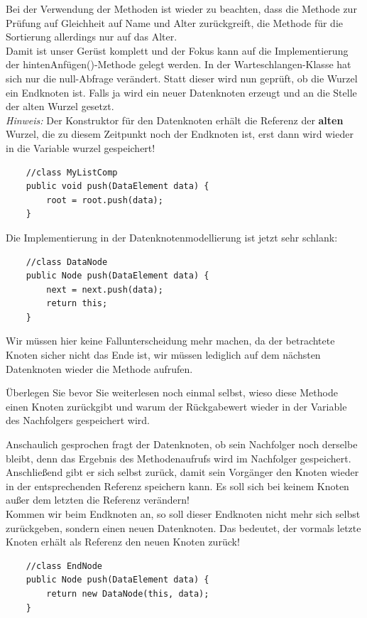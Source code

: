 \documentclass{article}
\begin{document}
Bei der Verwendung der Methoden ist wieder zu beachten, dass die Methode zur Prüfung auf Gleichheit auf Name und Alter zurückgreift, die Methode für die Sortierung allerdings nur auf das Alter. \\
Damit ist unser Gerüst komplett und der Fokus kann auf die Implementierung der hintenAnfügen()-Methode gelegt werden. In der Warteschlangen-Klasse hat sich nur die null-Abfrage verändert. Statt dieser wird nun geprüft, ob die Wurzel ein Endknoten ist. Falls ja wird ein neuer Datenknoten erzeugt und an die Stelle der alten Wurzel gesetzt. \\
\textit{Hinweis:} Der Konstruktor für den Datenknoten erhält die Referenz der \textbf{alten} Wurzel, die zu diesem Zeitpunkt noch der Endknoten ist, erst dann wird wieder in die Variable wurzel gespeichert! 
\begin{verbatim}
    //class MyListComp
    public void push(DataElement data) {
        root = root.push(data);
    }
\end{verbatim}
Die Implementierung in der Datenknotenmodellierung ist jetzt sehr schlank: 
\begin{verbatim}
    //class DataNode
    public Node push(DataElement data) {
        next = next.push(data);
        return this; 
    }
\end{verbatim}
Wir müssen hier keine Fallunterscheidung mehr machen, da der betrachtete Knoten sicher nicht das Ende ist, wir müssen lediglich auf dem nächsten Datenknoten wieder die Methode aufrufen. \\
\begin{task}{1}
Überlegen Sie bevor Sie weiterlesen noch einmal selbst, wieso diese Methode einen Knoten zurückgibt und warum der Rückgabewert wieder in der Variable des Nachfolgers gespeichert wird. 
\end{task}
\vspace{2cm}
Anschaulich gesprochen fragt der Datenknoten, ob sein Nachfolger noch derselbe bleibt, denn das Ergebnis des Methodenaufrufs wird im Nachfolger gespeichert. Anschließend gibt er sich selbst zurück, damit sein Vorgänger den Knoten wieder in der entsprechenden Referenz speichern kann. Es soll sich bei keinem Knoten außer dem letzten die Referenz verändern! \\
Kommen wir beim Endknoten an, so soll dieser Endknoten nicht mehr sich selbst zurückgeben, sondern einen neuen Datenknoten. Das bedeutet, der vormals letzte Knoten erhält als Referenz den neuen Knoten zurück! 
\begin{verbatim}
    //class EndNode
    public Node push(DataElement data) {
        return new DataNode(this, data);
    }
\end{verbatim}
\end{document}
